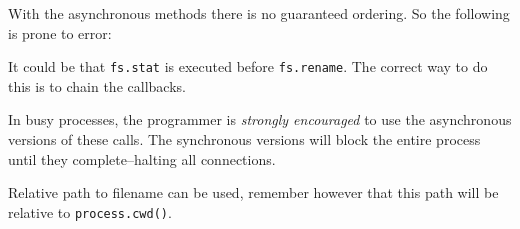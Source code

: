 With the asynchronous methods there is no guaranteed ordering. So the
following is prone to error:

\begin{Shaded}
\begin{Highlighting}[]
\NormalTok{(}\NormalTok{, }\NormalTok{, } 
    
  \NormalTok{(}\NormalTok{);}
\NormalTok{\});}
\NormalTok{(}\NormalTok{, } 
    
  \NormalTok{(} \NormalTok{+ }
\NormalTok{\});}
\end{Highlighting}
\end{Shaded}

It could be that \texttt{fs.stat} is executed before \texttt{fs.rename}.
The correct way to do this is to chain the callbacks.

\begin{Shaded}
\begin{Highlighting}[]
\NormalTok{(}\NormalTok{, }\NormalTok{, } 
    
  \NormalTok{(}\NormalTok{, } 
      
    \NormalTok{(} \NormalTok{+ }
  \NormalTok{\});}
\NormalTok{\});}
\end{Highlighting}
\end{Shaded}

In busy processes, the programmer is \emph{strongly encouraged} to use
the asynchronous versions of these calls. The synchronous versions will
block the entire process until they complete--halting all connections.

Relative path to filename can be used, remember however that this path
will be relative to \texttt{process.cwd()}.

